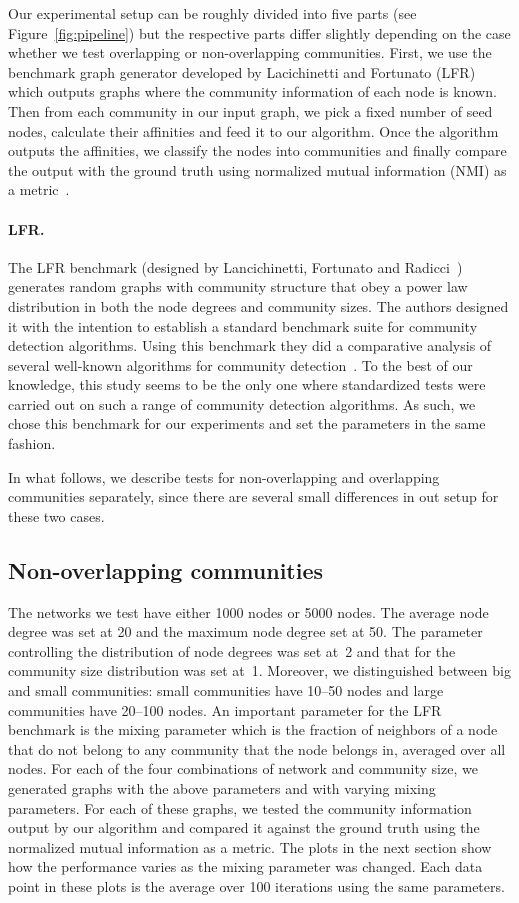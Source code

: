 Our experimental setup can be roughly divided into five parts (see Figure~\ref{fig:pipeline}) but the 
respective parts differ slightly depending on the case whether we test overlapping or non-overlapping 
communities. First, we use the benchmark graph generator developed by Lacichinetti and Fortunato 
(LFR)~\cite{LFR08, LF09} which outputs graphs where the community information of each node 
is known. Then from each community in our input graph, we pick a fixed number of seed nodes, 
calculate their affinities and feed it to our algorithm. Once the algorithm outputs the 
affinities, we classify the nodes into communities and finally compare the output 
with the ground truth using normalized mutual information (NMI) as a metric~\cite{DDDA05}.


\paragraph{LFR.}
The LFR benchmark (designed by Lancichinetti, Fortunato and Radicci~\cite{LFR08}) 
generates random graphs with community structure that obey a power law 
distribution in both the node degrees and community sizes. The authors designed it 
with the intention to establish a standard benchmark suite for community detection 
algorithms. Using this benchmark they did a comparative analysis of several well-known algorithms
for community detection~\cite{LF09}. To the best of our knowledge, this study seems to be the 
only one where standardized tests were carried out on such a range of community detection algorithms. 
As such, we chose this benchmark for our experiments and set the parameters in the same fashion. 

In what follows, we describe tests for non-overlapping and overlapping communities separately, since 
there are several small differences in out setup for these two cases. 

\subsection{Non-overlapping communities}
The networks we test have either 1000 nodes or 5000 nodes. The average node degree
was set at 20 and the maximum node degree set at 50. The parameter controlling the 
distribution of node degrees was set at~2 and that for the community size distribution was 
set at~1. Moreover, we distinguished between big and small communities: small communities have 
10--50 nodes and large communities have 20--100 nodes. An important parameter 
for the LFR benchmark is the mixing parameter which is the fraction of neighbors 
of a node that do not belong to any community that the node belongs in, averaged over all nodes.
For each of the four combinations of network and community size, we generated graphs with the 
above parameters and with varying mixing parameters. For each of these graphs, we tested the 
community information output by our algorithm and compared it against the ground truth 
using the normalized mutual information as a metric. The plots in the next section 
show how the performance varies as the mixing parameter was changed. Each data point in 
these plots is the average over 100 iterations using the same parameters. 

